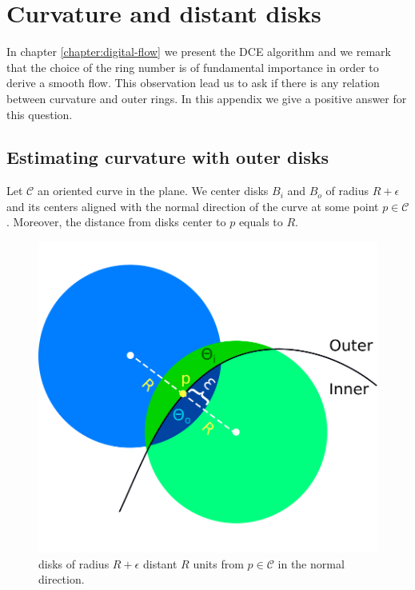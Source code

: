 \chapter{Curvature and distant disks}\label{appendix:curvature-and-distant-disks}

In chapter \ref{chapter:digital-flow} we present the DCE algorithm and we remark that the choice of the ring number is of fundamental importance in order to derive a smooth flow. This observation lead us to ask if there is any relation between curvature and outer rings. In this appendix we give a positive answer for this question.

\section{Estimating curvature with outer disks}

Let $\mathcal{C}$ an oriented curve in the plane. We center disks $B_i$ and $B_o$ of radius $R + \epsilon$ and its centers aligned with the normal direction of the curve at some point $p \in \mathcal{C}$. Moreover, the distance from disks center to $p$ equals to $R$.

\begin{figure}
\center
\includegraphics[scale=0.35]{figures/appendix-max-energy/r-separated-disks.png}
\caption{disks of radius $R+\epsilon$ distant $R$ units from $p\in \mathcal{C}$ in the normal direction.}
\label{fig:r-separated-disks}
\end{figure}

